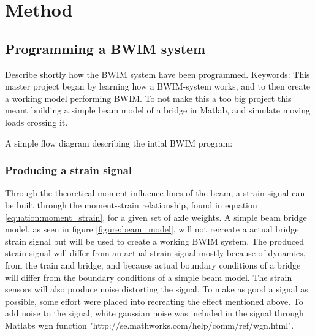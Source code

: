 \section{Method}

\subsection{Programming a BWIM system}
Describe shortly how the BWIM system have been programmed.
Keywords:
This master project began by learning how a BWIM-system works, and to then create a working model performing BWIM. To not make this a too big project this meant building a simple beam model of a bridge in Matlab, and simulate moving loads crossing it.

A simple flow diagram describing the intial BWIM program:
\begin{figure}[H]
	\centering
	
\end{figure}


\subsubsection{Producing a strain signal}
Through the theoretical moment influence lines of the beam, a strain signal can be built through the moment-strain relationship, found in equation \ref{equation:moment_strain}, for a given set of axle weights. A simple beam bridge model, as seen in figure \ref{figure:beam_model}, will not recreate a actual bridge strain signal but will be used to create a working BWIM system. The produced strain signal will differ from an actual strain signal mostly because of dynamics, from the train and bridge, and because actual boundary conditions of a bridge will differ from the boundary conditions of a simple beam model. The strain sensors will also produce noise distorting the signal.
To make as good a signal as possible, some effort were placed into recreating the effect mentioned above. To add noise to the signal, white gaussian noise was included in the signal through Matlabs wgn function "http://se.mathworks.com/help/comm/ref/wgn.html".


